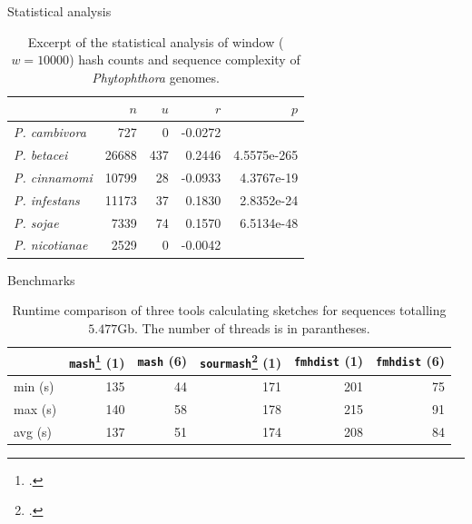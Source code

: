 \documentclass[aspectratio=169]{beamer}
\begin{document}
\begin{frame}{Statistical analysis}
    \begin{table}
        \begin{tabular}{@{}lrrrr@{}}
        \toprule
        \textbf{}                           & $\textbf{$n$}$ & \textbf{$u$} & \textbf{$r$} &  \textbf{$p$}  \\ \midrule
        \textit{P. cambivora}               & 727        & 0          & -0.0272      &               \\
        \textit{P. betacei}                 & 26688      & 437        & 0.2446       & 4.5575e-265  \\
        \textit{P. cinnamomi}               & 10799      & 28         & -0.0933      & 4.3767e-19  \\
        \textit{P. infestans}               & 11173      & 37         & 0.1830       & 2.8352e-24   \\
        \textit{P. sojae}                   & 7339       & 74         & 0.1570       & 6.5134e-48    \\
        \textit{P. nicotianae}              & 2529       & 0          & -0.0042      &                         \\ \bottomrule
        \end{tabular}
        \caption{Excerpt of the statistical analysis of window ($w=10000$) hash
        counts and sequence complexity of \textit{Phytophthora} genomes.}
        \label{ta:hashCountComplexity}
      \end{table}
\end{frame}

\begin{frame}{Benchmarks}
    \begin{table}[]
        \centering
        \begin{tabular}{@{}lrrrrr@{}}
        \toprule
                        & \texttt{mash}\footcite{ondovMashFastGenome2016} (1)     & \texttt{mash} (6) & \texttt{sourmash}\footcite{irberLightweightCompositionalAnalysis2022} (1) & \texttt{fmhdist} (1) & \texttt{fmhdist} (6) \\ \midrule
        min (s) & 135                     &  44                     &  171              &  201                      & 75                         \\
        max (s) & 140                     &  58                     &  178              &  215                      & 91                         \\
        avg (s) & 137                     &  51                     &  174              &  208                      & 84                         \\ \bottomrule
        \end{tabular}
        \caption{Runtime comparison of three tools calculating sketches for
        sequences totalling $5.477$Gb. The number of threads is in parantheses.}
        \label{ta:performance}
      \end{table}
\end{frame}
\end{document}
